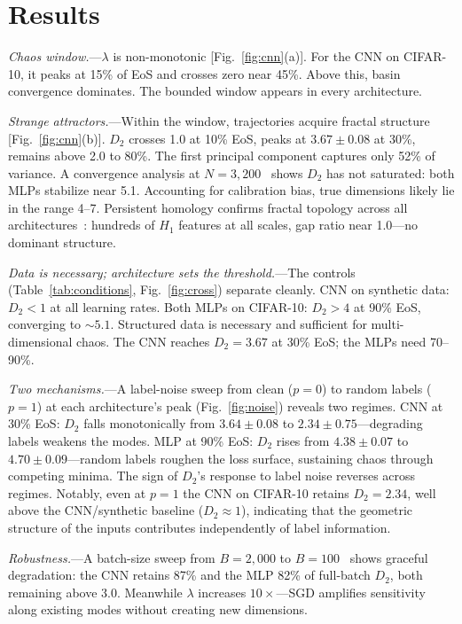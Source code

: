 \documentclass[aps,prl,twocolumn,superscriptaddress,floatfix]{revtex4-2}
\begin{document}
\section{Results}

\textit{Chaos window.}---$\lambda$ is non-monotonic [Fig.~\ref{fig:cnn}(a)]. For the CNN on CIFAR-10, it peaks at 15\% of EoS and crosses zero near 45\%. Above this, basin convergence dominates. The bounded window appears in every architecture.

\textit{Strange attractors.}---Within the window, trajectories acquire fractal structure [Fig.~\ref{fig:cnn}(b)]. $D_2$ crosses 1.0 at 10\% EoS, peaks at $3.67 \pm 0.08$ at 30\%, remains above 2.0 to 80\%. The first principal component captures only 52\% of variance. A convergence analysis at $N = 3{,}200$~\cite{sm} shows $D_2$ has not saturated: both MLPs stabilize near 5.1. Accounting for calibration bias, true dimensions likely lie in the range 4--7. Persistent homology confirms fractal topology across all architectures~\cite{sm}: hundreds of $H_1$ features at all scales, gap ratio near 1.0---no dominant structure.

\textit{Data is necessary; architecture sets the threshold.}---The controls (Table~\ref{tab:conditions}, Fig.~\ref{fig:cross}) separate cleanly. CNN on synthetic data: $D_2 < 1$ at all learning rates. Both MLPs on CIFAR-10: $D_2 > 4$ at 90\% EoS, converging to ${\sim}5.1$. Structured data is necessary and sufficient for multi-dimensional chaos. The CNN reaches $D_2 = 3.67$ at 30\% EoS; the MLPs need 70--90\%.

\textit{Two mechanisms.}---A label-noise sweep from clean ($p = 0$) to random labels ($p = 1$) at each architecture's peak (Fig.~\ref{fig:noise}) reveals two regimes. CNN at 30\% EoS: $D_2$ falls monotonically from $3.64 \pm 0.08$ to $2.34 \pm 0.75$---degrading labels weakens the modes. MLP at 90\% EoS: $D_2$ rises from $4.38 \pm 0.07$ to $4.70 \pm 0.09$---random labels roughen the loss surface, sustaining chaos through competing minima. The sign of $D_2$'s response to label noise reverses across regimes. Notably, even at $p = 1$ the CNN on CIFAR-10 retains $D_2 = 2.34$, well above the CNN/synthetic baseline ($D_2 \approx 1$), indicating that the geometric structure of the inputs contributes independently of label information.

\textit{Robustness.}---A batch-size sweep from $B = 2{,}000$ to $B = 100$~\cite{sm} shows graceful degradation: the CNN retains 87\% and the MLP 82\% of full-batch $D_2$, both remaining above 3.0. Meanwhile $\lambda$ increases $10\times$---SGD amplifies sensitivity along existing modes without creating new dimensions.
\end{document}
